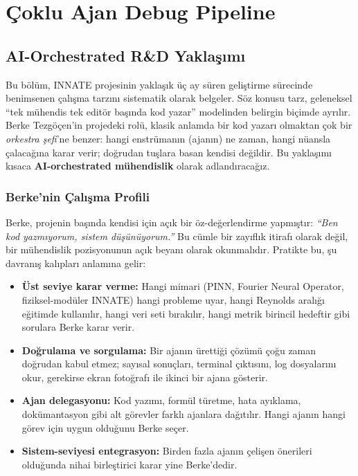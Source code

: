 \chapter{Çoklu Ajan Debug Pipeline}
\label{ch:multi_agent}

\section{AI-Orchestrated R\&D Yaklaşımı}
\label{sec:ma_orchestrated}

Bu bölüm, INNATE projesinin yaklaşık üç ay süren geliştirme sürecinde
benimsenen çalışma tarzını sistematik olarak belgeler. Söz konusu tarz,
geleneksel ``tek mühendis tek editör başında kod yazar'' modelinden
belirgin biçimde ayrılır. Berke Tezgöçen'in projedeki rolü, klasik
anlamda bir kod yazarı olmaktan çok bir \emph{orkestra şefi}'ne benzer:
hangi enstrümanın (ajanın) ne zaman, hangi nüansla çalacağına karar
verir; doğrudan tuşlara basan kendisi değildir. Bu yaklaşımı kısaca
\textbf{AI-orchestrated mühendislik} olarak adlandıracağız.

\subsection{Berke'nin Çalışma Profili}

Berke, projenin başında kendisi için açık bir öz-değerlendirme yapmıştır:
\emph{``Ben kod yazmıyorum, sistem düşünüyorum.''} Bu cümle bir zayıflık
itirafı olarak değil, bir mühendislik pozisyonunun açık beyanı olarak
okunmalıdır. Pratikte bu, şu davranış kalıpları anlamına gelir:

\begin{itemize}
  \item \textbf{Üst seviye karar verme:} Hangi mimari (PINN, Fourier
        Neural Operator, fiziksel-modüler INNATE) hangi probleme uyar,
        hangi Reynolds aralığı eğitimde kullanılır, hangi veri seti
        bırakılır, hangi metrik birincil hedeftir gibi sorulara
        Berke karar verir.
  \item \textbf{Doğrulama ve sorgulama:} Bir ajanın ürettiği çözümü
        çoğu zaman doğrudan kabul etmez; sayısal sonuçları, terminal
        çıktısını, log dosyalarını okur, gerekirse ekran fotoğrafı ile
        ikinci bir ajana gösterir.
  \item \textbf{Ajan delegasyonu:} Kod yazımı, formül türetme, hata
        ayıklama, dokümantasyon gibi alt görevler farklı ajanlara
        dağıtılır. Hangi ajanın hangi görev için uygun olduğunu Berke
        seçer.
  \item \textbf{Sistem-seviyesi entegrasyon:} Birden fazla ajanın çelişen
        önerileri olduğunda nihai birleştirici karar yine Berke'dedir.
\end{itemize}


